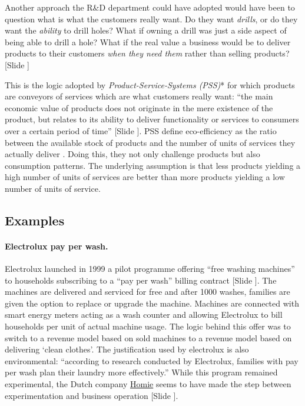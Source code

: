 \documentclass{article}
\newcounter{slide}
\begin{document}
Another approach the R\&D department could have adopted would have been to question what is what the customers really want. Do they want \emph{drills}, or do they want the \emph{ability} to drill holes? What if owning a drill was just a side aspect of being able to drill a hole? What if the real value a business would be to deliver products to their customers \emph{when they need them} rather than selling products? {\color{blue}[Slide ]}
 
This is the logic adopted by \emph{Product-Service-Systems (PSS)}* for which products are conveyors of services which are what customers really want: ``the main economic value of products does not originate in the mere existence of the product, but relates to its ability to deliver functionality or services to consumers over a certain period of time'' \cite{tukkerEightTypesProduct2004} {\color{blue}[Slide ]}. PSS define eco-efficiency as the ratio between the available stock of products and the number of units of services they actually deliver \cite{meijkampChangingConsumerBehaviour1999}. Doing this, they not only challenge products but also consumption patterns. The underlying assumption is that less products yielding a high number of units of services are better than more products yielding a low number of units of service. 

\subsection{Examples}
\label{sec:pssExamples}

\paragraph{Electrolux pay per wash.}\label{Electrolux}
Electrolux launched in 1999 a pilot programme offering ``free washing machines'' to households subscribing to a ``pay per wash'' billing contract \href{https://www.electroluxgroup.com/en/electrolux-offers-7000-households-free-washing-machines-1885/}{\cite{eletroluxElectroluxOffers0001999}} {\color{blue}[Slide ]}. The machines are delivered and serviced for free and after 1000 washes, families are given the option to replace or upgrade the machine. Machines are connected with smart energy meters acting as a wash counter and allowing Electrolux to bill households per unit of actual machine usage. The logic behind this offer was to switch to a revenue model based on sold machines to a revenue model based on delivering `clean clothes'. The justification used by electrolux is also environmental: ``according to research conducted by Electrolux, families with pay per wash plan their laundry more effectively.'' While this program remained experimental, the Dutch company \href{https://www.homiepayperuse.com/?webpage=13}{Homie} seems to have made the step between experimentation and business operation {\color{blue}[Slide ]}.
\end{document}
